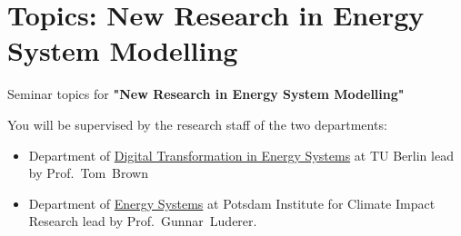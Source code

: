 \documentclass[10pt,aspectratio=169,dvipsnames]{beamer}
\begin{document}

    



\section{Topics: New Research in Energy System Modelling}

\begin{frame}
Seminar topics for {\bf "New Research in Energy System Modelling"}

You will be supervised by the research staff of the two departments:  
    \begin{itemize}
        \item Department of \href{https://www.ensys.tu-berlin.de/menue/overview/}{Digital Transformation in Energy Systems} at TU Berlin lead by Prof.~Tom~Brown
        \item Department of \href{https://www.pik-potsdam.de/en/institute/departments/transformation-pathways/research/energy-systems}{Energy Systems} at Potsdam Institute for Climate Impact Research lead by Prof.~Gunnar~Luderer.
    \end{itemize}
\end{frame}
\end{document}
